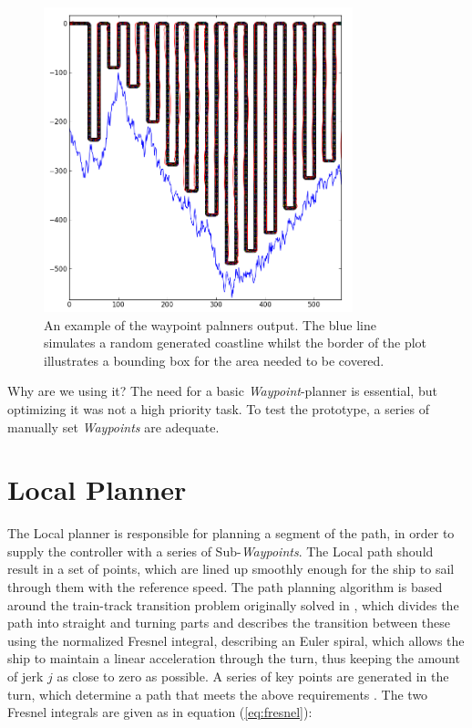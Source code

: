 \begin{figure}
\centering
\includegraphics[width = 0.8\textwidth]{img/LocalPlannerFigures/Auto_WP_Planning.png}
\caption{An example of the waypoint palnners output. The blue line simulates a random generated coastline whilst the border of the plot illustrates a bounding box for the area needed to be covered.}
\label{fig:wp_planner}
\end{figure}

Why are we using it?
The need for a basic \emph{Waypoint}-planner is essential, but optimizing it was not a high priority task. To test the prototype, a series of manually set \emph{Waypoints} are adequate.

\section{Local Planner}

The Local planner is responsible for planning a segment of the path, in order to supply the controller with a series of Sub-\emph{Waypoints}. The Local path should result in a set of points, which are lined up smoothly enough for the ship to sail through them with the reference speed.
The path planning algorithm is based around the train-track transition problem originally solved in \citep{Art1}, which divides the path into straight and turning parts and describes the transition between these using the normalized Fresnel integral, describing an Euler spiral, which allows the ship to maintain a linear acceleration through the turn, thus keeping the amount of jerk $j$ as close to zero as possible. A series of key points are generated in the turn, which determine a path that meets the above requirements \citep{Art2}. The two Fresnel integrals are given as in equation (\ref{eq:fresnel}):

